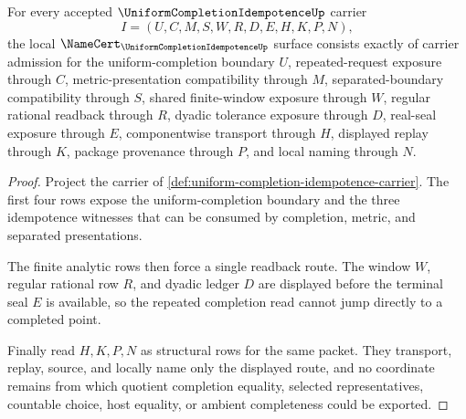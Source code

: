 \begin{theorem}
\label{thm:uniform-completion-idempotence-namecert-obligations}
For every accepted $\UniformCompletionIdempotenceUp$ carrier
$$
I=(U,C,M,S,W,R,D,E,H,K,P,N),
$$
the local $\NameCert_{\UniformCompletionIdempotenceUp}$ surface consists exactly of carrier admission for the uniform-completion boundary $U$, repeated-request exposure through $C$, metric-presentation compatibility through $M$, separated-boundary compatibility through $S$, shared finite-window exposure through $W$, regular rational readback through $R$, dyadic tolerance exposure through $D$, real-seal exposure through $E$, componentwise transport through $H$, displayed replay through $K$, package provenance through $P$, and local naming through $N$.
\end{theorem}
\begin{proof}
Project the carrier of \autoref{def:uniform-completion-idempotence-carrier}. The first four rows expose the uniform-completion boundary and the three idempotence witnesses that can be consumed by completion, metric, and separated presentations.

The finite analytic rows then force a single readback route. The window $W$, regular rational row $R$, and dyadic ledger $D$ are displayed before the terminal seal $E$ is available, so the repeated completion read cannot jump directly to a completed point.

Finally read $H,K,P,N$ as structural rows for the same packet. They transport, replay, source, and locally name only the displayed route, and no coordinate remains from which quotient completion equality, selected representatives, countable choice, host equality, or ambient completeness could be exported.
\end{proof}

